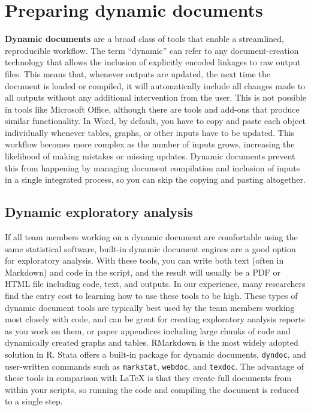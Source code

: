 \section{Preparing dynamic documents}

\textbf{Dynamic documents}
are a broad class of tools that enable a streamlined, reproducible workflow.
The term ``dynamic'' can refer to any document-creation technology
that allows the inclusion of explicitly encoded linkages to raw output files.
This means that, whenever outputs are updated,
the next time the document is loaded or compiled, it will automatically include
all changes made to all outputs without any additional intervention from the user.
This is not possible in tools like Microsoft Office,
although there are tools and add-ons that produce similar functionality.
In Word, by default, you have to copy and paste each object individually
whenever tables, graphs, or other inputs have to be updated.
This workflow becomes more complex as the number of inputs grows,
increasing the likelihood of making mistakes or missing updates.
Dynamic documents prevent this from happening by managing document compilation and
inclusion of inputs in a single integrated process,
so you can skip the copying and pasting altogether.

\subsection{Dynamic exploratory analysis}

If all team members working on a dynamic document are comfortable using the same statistical software,
built-in dynamic document engines are a good option for exploratory analysis.
With these tools,
you can write both text (often in Markdown) and code in the script,
and the result will usually be a PDF or HTML file including code, text, and outputs.
In our experience, many researchers find the entry cost to learning how to use these tools to be high.
These types of dynamic document tools are typically best used by the team members working most closely with code,
and can be great for creating exploratory analysis reports as you work on them,
or paper appendices including large chunks of code and dynamically created graphs and tables.
RMarkdown is the most widely adopted solution in R.
Stata offers a built-in package for dynamic documents, \texttt{dyndoc},
and user-written commands such as \texttt{markstat},
\texttt{webdoc}, and
\texttt{texdoc}.
The advantage of these tools in comparison with LaTeX is that
they create full documents from within your scripts,
so running the code and compiling the document is reduced to a single step.

